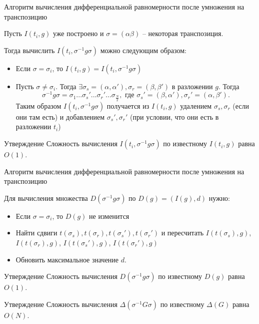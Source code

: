 \documentclass[11pt]{beamer}
\begin{document}
\begin{frame}{Алгоритм вычисления дифференциальной равномерности после умножения на транспозицию}

Пусть $I(t_i,g)$ уже построено и $\sigma = (\alpha \beta)$ -- некоторая транспозиция.

Тогда вычислить $I(t_i,\sigma^{-1}g\sigma)$ можно следующим образом:
\begin{itemize}
\item Если $\sigma = \sigma_i$, то $I(t_i,g)=I(t_i,\sigma^{-1}g\sigma)$
\item Пусть $\sigma \neq \sigma_i$. Тогда $\exists \sigma_s=(\alpha, \alpha'),\sigma_r=(\beta, \beta')$ в разложении $g$. Тогда $$\sigma^{-1}g\sigma = \sigma_1...\sigma_s'...\sigma_r'...\sigma_{\frac{N}{2}}, \text{ где } \sigma_s'=(\beta, \alpha'),\sigma_r'=(\alpha, \beta').$$
Таким образом $I(t_i, \sigma^{-1}g\sigma)$ получается из $I(t_i,g)$ удалением $\sigma_s,\sigma_r$ (если они там есть) и добавлением $\sigma_s',\sigma_r'$ (при условии, что они есть в разложении $t_i$)
\end{itemize}

\begin{block}{Утверждение}
 Сложность вычисления $I(t_i,\sigma^{-1}g\sigma)$ по известному $I(t_i,g)$ равна $O(1)$.
\end{block}
\end{frame}


\begin{frame}{Алгоритм вычисления дифференциальной равномерности после умножения на транспозицию}

Для вычисления множества $D(\sigma^{-1}g\sigma)$ по $D(g) = (I(g), d)$ нужно:
\begin{itemize}
\item Если $\sigma = \sigma_i$, то $D(g)$ не изменится
\item Найти сдвиги $t(\sigma_s), t(\sigma_r), t(\sigma_s'), t(\sigma_r')$ и пересчитать $I(t(\sigma_s),g)$, $I(t(\sigma_r),g)$, $I( t(\sigma_s'),g)$, $I(t(\sigma_r'),g)$
\item Обновить максимальное значение $d$.
\end{itemize}

\begin{block}{Утверждение}
 Сложность вычисления $D(\sigma^{-1}g\sigma)$ по известному $D(g)$ равна $O(1)$.
\end{block}

\begin{block}{Утверждение}
 Сложность вычисления $\Delta(\sigma^{-1} G  \sigma)$ по известному $\Delta(G)$ равна $O(N)$.
\end{block}
\end{frame}
\end{document}
